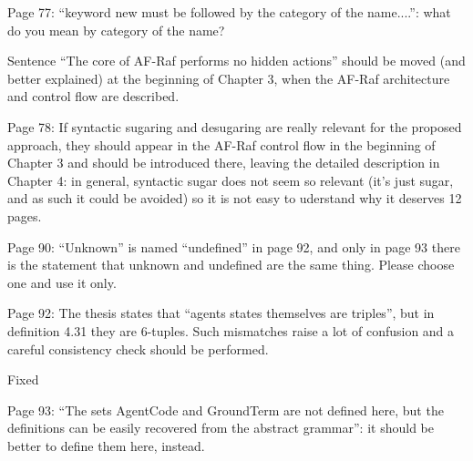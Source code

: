 \documentclass{article}
\newcommand{\todo}[1]{[\textcolor{red}{TODO}: #1]}
\newenvironment{them}{\noindent\begingroup\color{blue}}{\endgroup\par}
\begin{document}
\begin{them}

Page 77:
“keyword new must be followed by the category of the name....”: what do you mean by category of
the name?
\end{them}
\todo{}

\begin{them}

Sentence “The core of AF-Raf performs no hidden actions” should be moved (and better explained)
at the beginning of Chapter 3, when the AF-Raf architecture and control flow are described.
\end{them}
\todo{}

\begin{them}

Page 78:
If syntactic sugaring and desugaring are really relevant for the proposed approach, they should
appear in the AF-Raf control flow in the beginning of Chapter 3 and should be introduced there,
leaving the detailed description in Chapter 4: in general, syntactic sugar does not seem so relevant
(it's just sugar, and as such it could be avoided) so it is not easy to uderstand why it deserves 12
pages.
\end{them}
\todo{}

\begin{them}

Page 90:
“Unknown” is named “undefined” in page 92, and only in page 93 there is the statement that
unknown and undefined are the same thing. Please choose one and use it only.
\end{them}
\todo{}

\begin{them}

Page 92:
The thesis states that “agents states themselves are triples”, but in definition 4.31 they are 6-tuples.
Such mismatches raise a lot of confusion and a careful consistency check should be performed.
\end{them}
Fixed

\begin{them}

Page 93:
“The sets AgentCode and GroundTerm are not defined here, but the definitions can be easily
recovered from the abstract grammar”: it should be better to define them here, instead.
\end{them}
\todo{}
\end{document}

